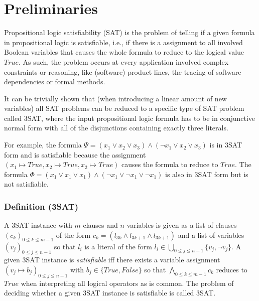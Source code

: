 \section{Preliminaries}
\label{sec:preliminaries}

Propositional logic satisfiability (SAT) is the problem of telling if a given formula in propositional logic is satisfiable, i.e., if there is a assignment to all involved Boolean variables that causes the whole formula to reduce to the logical value $\textit{True}$. As such, the problem occurs at every application involved complex constraints or reasoning, like (software) product lines, the tracing of software dependencies or formal methods.

It can be trivially shown that (when introducing a linear amount of new variables) all SAT problems can be reduced to a specific type of SAT problem called 3SAT, where the input propositional logic formula has to be in conjunctive normal form with all of the disjunctions containing exactly three literals.

For example, the formula $\Psi = ( x_{1} \vee x_{2} \vee x_{3}) \wedge ( \lnot x_{1} \vee x_{2} \vee x_{3})$ is in 3SAT form and is satisfiable because the assignment $(x_1 \mapsto \textit{True}, x_2 \mapsto \textit{True}, x_2 \mapsto \textit{True})$ causes the formula to reduce to $\textit{True}$. The formula $\Phi = ( x_{1} \vee x_{1} \vee x_{1}) \wedge ( \lnot x_{1} \vee \lnot x_{1}  \vee \lnot x_{1} )$ is also in 3SAT form but is not satisfiable.

\subsubsection{Definition (3SAT)}
A 3SAT instance with $m$ clauses and $n$ variables is given as a list of clauses $(c_k)_{0 \leq k \leq m-1}$ of the form $c_k = (l_{3k} \land l_{3k+1} \land l_{3k+1})$ and a list of variables $(v_j)_{0 \leq j \leq n-1}$ so that $l_i$ is a literal of the form $l_i \in \bigcup_{0 \leq j \leq n-1} \{v_j, \lnot v_j\}$. A given 3SAT instance is \emph{satisfiable} iff there exists a variable assignment $(v_j \mapsto b_j)_{0 \leq j \leq n-1}$ with $b_j \in \{\textit{True}, \textit{False}\}$ so that $\bigwedge_{0 \leq k \leq m-1} c_k$ reduces to $\textit{True}$ when interpreting all logical operators as is common. The problem of deciding whether a given 3SAT instance is satisfiable is called 3SAT.\\ \\

